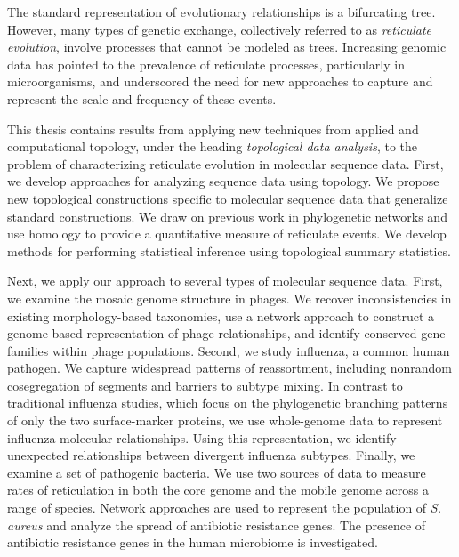 
The standard representation of evolutionary relationships is a bifurcating tree.
However, many types of genetic exchange, collectively referred to as \emph{reticulate evolution}, involve processes that cannot be modeled as trees.
Increasing genomic data has pointed to the prevalence of reticulate processes, particularly in microorganisms, and underscored the need for new approaches to capture and represent the scale and frequency of these events.

This thesis contains results from applying new techniques from applied and computational topology, under the heading \emph{topological data analysis}, to the problem of characterizing reticulate evolution in molecular sequence data.
First, we develop approaches for analyzing sequence data using topology.
We propose new topological constructions specific to molecular sequence data that generalize standard constructions.
We draw on previous work in phylogenetic networks and use homology to provide a quantitative measure of reticulate events.
We develop methods for performing statistical inference using topological summary statistics.

Next, we apply our approach to several types of molecular sequence data.
First, we examine the mosaic genome structure in phages.
We recover inconsistencies in existing morphology-based taxonomies, use a network approach to construct a genome-based representation of phage relationships, and identify conserved gene families within phage populations.
Second, we study influenza, a common human pathogen.
We capture widespread patterns of reassortment, including nonrandom cosegregation of segments and barriers to subtype mixing.
In contrast to traditional influenza studies, which focus on the phylogenetic branching patterns of only the two surface-marker proteins, we use whole-genome data to represent influenza molecular relationships.
Using this representation, we identify unexpected relationships between divergent influenza subtypes.
Finally, we examine a set of pathogenic bacteria.
We use two sources of data to measure rates of reticulation in both the core genome and the mobile genome across a range of species.
Network approaches are used to represent the population of \emph{S. aureus} and analyze the spread of antibiotic resistance genes.
The presence of antibiotic resistance genes in the human microbiome is investigated.